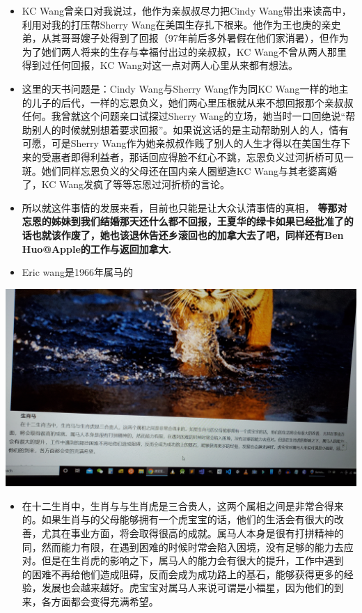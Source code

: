 \documentclass[9pt, b5paper]{article}
\begin{document}
\begin{itemize}
\begin{itemize}
\begin{itemize}
\item KC Wang曾亲口对我说过，他作为亲叔叔尽力把Cindy Wang带出来读高中，利用对我的打压帮Sherry Wang在美国生存扎下根来。他作为王也庚的亲史弟，从其哥哥嫂子处得到了回报（97年前后多外暑假在他们家消暑），但作为为了她们两人将来的生存与幸福付出过的亲叔叔，KC Wang不曾从两人那里得到过任何回报，KC Wang对这一点对两人心里从来都有想法。
\item 这里的天书问题是：Cindy Wang与Sherry Wang作为同KC Wang一样的地主的儿子的后代，一样的忘恩负义，她们两心里压根就从来不想回报那个亲叔叔任何。我曾就这个问题亲口试探过Sherry Wang的立场，她当时一口回绝说“帮助别人的时候就别想着要求回报”。如果说这话的是主动帮助别人的人，情有可愿，可是Sherry Wang作为她亲叔叔作贱了别人的人生才得以在美国生存下来的受惠者即得利益者，那话回应得脸不红心不跳，忘恩负义过河折桥可见一斑。她们同样忘恩负义的父母还在国内亲人圈塑造KC Wang与其老婆离婚了，KC Wang发疯了等等忘恩过河折桥的言论。
\item 所以就这件事情的发展来看，目前也只能是让大众认清事情的真相， \textbf{等那对忘恩的姊妹到我们结婚那天还什么都不回报，王夏华的绿卡如果已经批准了的话也就该作废了，她也该退休告还乡滚回也的加拿大去了吧，同样还有Ben Huo@Apple的工作与返回加拿大.}
\item Eric wang是1966年属马的
\end{itemize}
\includegraphics[width=.9\linewidth]{./pic/20210218_200445.jpg}
\begin{itemize}
\item 在十二生肖中，生肖与与生肖虎是三合贵人，这两个属相之间是非常合得来的。如果生肖与的父母能够拥有一个虎宝宝的话，他们的生活会有很大的改善，尤其在事业方面，将会取得很高的成就。属马人本身是很有打拼精神的同，然而能力有限，在遇到困难的时候时常会陷入困境，没有足够的能力去应对。但是在生肖虎的影响之下，属马人的能力会有很大的提升，工作中遇到 的困难不再给他们造成阻碍，反而会成为成功路上的基石，能够获得更多的经验，发展也会越来越好。虎宝宝对属马人来说可谓是小福星，因为他们的到来，各方面都会变得充满希望。

\end{itemize}
\end{itemize}
\end{itemize}
\end{document}
